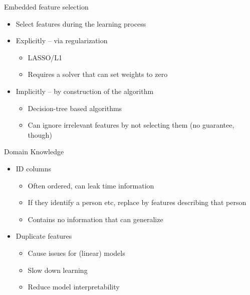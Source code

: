 \documentclass[11pt,compress,t,notes=noshow, xcolor=table]{beamer}
\date{}
\begin{document}


\begin{frame}{Embedded feature selection}
    \begin{itemize}
        \item Select features during the learning process
        \item Explicitly -- via regularization
        \begin{itemize}
            \item LASSO/L1
            \item Requires a solver that can set weights to zero
        \end{itemize}
        \item Implicitly -- by construction of the algorithm
        \begin{itemize}
            \item Decision-tree based algorithms
            \item Can ignore irrelevant features by not selecting them (no guarantee, though)
        \end{itemize}
    \end{itemize}
\end{frame}

\begin{frame}{Domain Knowledge}
\begin{itemize}
    \item ID columns
    \begin{itemize}
        \item Often ordered, can leak time information
        \item If they identify a person etc, replace by features describing that person
        \item Contains no information that can generalize
    \end{itemize}
    \item Duplicate features
    \begin{itemize}
        \item Cause issues for (linear) models
        \item Slow down learning
        \item Reduce model interpretability
    \end{itemize}
\end{itemize}
\end{frame}
\end{document}
